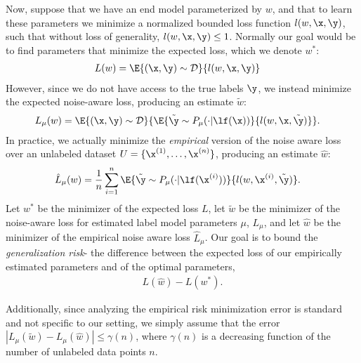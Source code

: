 \documentclass[letterpaper]{article}
\begin{document}
\begin{appendix}
Now, suppose that we have an end model parameterized by $w$, and that to learn these parameters we minimize a normalized bounded loss function $l(w, \x, \y)$, such that without loss of generality, $l(w, \x, \y) \leq 1$.
Normally our goal would be to find parameters that minimize the expected loss, which we denote $w^*$:
\begin{align}
	L(w)
	&=
	\E{(\x,\y) \sim \mathcal{D}}{ l(w, \x, \y) }
\end{align}
However, since we do not have access to the true labels $\y$, we instead minimize the expected noise-aware loss, producing an estimate $\tilde{w}$:
\begin{align}
	L_\mu(w)
	&=
	\E{(\x,\y) \sim \mathcal{D}}{ 
		\E{\tilde{\y} \sim P_\mu(\cdot|\lf(\x))}{ l(w, \x, \tilde{\y}) }
	}.
\end{align}
In practice, we actually minimize the \textit{empirical} version of the noise aware loss over an unlabeled dataset $U = \{\x^{(1)},\ldots,\x^{(n)}\}$, producing an estimate $\hat{w}$:
\begin{align}
	\hat{L}_\mu(w)
	&=
	\frac1n \sum_{i=1}^n
		\E{\tilde{\y} \sim P_\mu(\cdot|\lf(\x^{(i)}))}{ 
			l(w, \x^{(i)}, \tilde{\y}) 
		}.
\end{align}
Let $w^*$ be the minimizer of the expected loss $L$, let $\tilde{w}$ be the minimizer of the noise-aware loss for estimated label model parameters $\mu$, $L_\mu$, and let $\hat{w}$ be the minimizer of the empirical noise aware loss $\hat{L}_\mu$.
Our goal is to bound the \textit{generalization risk}- the difference between the expected loss of our empirically estimated parameters and of the optimal parameters,
\begin{align}
	L(\hat{w}) - L(w^*).
\end{align}

Additionally, since analyzing the empirical risk minimization error is standard and not specific to our setting, we simply assume that the error $|L_\mu(\tilde{w}) - L_\mu(\hat{w})| \leq \gamma(n)$, where $\gamma(n)$ is a decreasing function of the number of unlabeled data points $n$.


\end{appendix}
\end{document}
